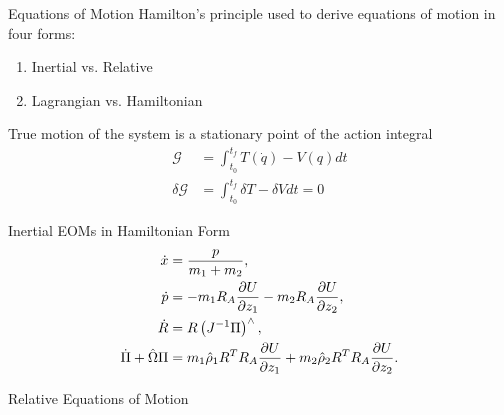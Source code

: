 \begin{frame}{Equations of Motion}
    Hamilton's principle used to derive equations of motion in four forms:
    \begin{enumerate}
        \item Inertial vs. Relative 
        \item Lagrangian vs. Hamiltonian
    \end{enumerate}
    True motion of the system is a stationary point of the action integral
    \begin{align*}
        \mathcal{G} &= \int_{t_0}^{t_f} T(\dot q) - V(q) dt\\
        \delta \mathcal{G} &= \int_{t_0}^{t_f} \delta T - \delta V dt = 0
    \end{align*}
\end{frame}

\begin{frame}{Inertial EOMs in Hamiltonian Form}
\begin{align}
    \dot {x} &= \frac{p}{m_1 + m_2}, \\
    \dot {p} &= - m_1 R_A \frac{\partial U}{\partial z_1} - m_2 R_A \frac{\partial U}{\partial z_2}, \\
    \dot {R} &= R \left( J^{-1} \Pi \right)^\wedge, \\
    \dot{\Pi}  + \hat{\Omega} \Pi &= m_1 \hat{\rho}_1 R^T R_A \frac{\partial U}{\partial z_1} + m_2 \hat{\rho}_2 R^T R_A \frac{\partial U}{\partial z_2}. 
\end{align}

\end{frame}

\begin{frame}{Relative Equations of Motion}

\end{frame}
